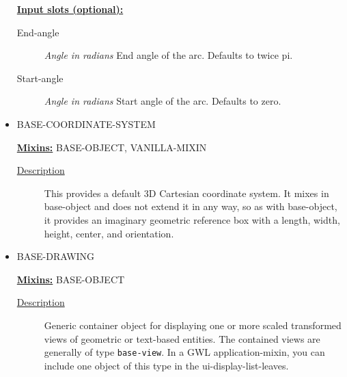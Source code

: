 \documentclass [11pt]{book}
\begin{document}
\begin{itemize}
\textbf{
\underline{Input slots (optional):}}

\begin{description}

\item [End-angle]
\emph{Angle in radians} End angle of the arc. Defaults to twice pi.


\item [Start-angle]
\emph{Angle in radians} Start angle of the arc. Defaults to zero.


\end{description}







\item {}BASE-COORDINATE-SYSTEM


\textbf{
\underline{Mixins:}} BASE-OBJECT, VANILLA-MIXIN





\begin{description}

\item [
\underline{Description}]


This provides a default 3D Cartesian
   coordinate system. It mixes in base-object and does not extend it
   in any way, so as with base-object, it provides an imaginary
   geometric reference box with a length, width, height, center, and
   orientation.



\end{description}









\item {}BASE-DRAWING


\textbf{
\underline{Mixins:}} BASE-OBJECT





\begin{description}

\item [
\underline{Description}]


Generic container object for displaying one or more scaled
transformed views of geometric or text-based entities. The contained views are generally 
of type \texttt{base-view}. In a GWL application-mixin, you can include one 
object of this type in the ui-display-list-leaves.


\end{description}
\end{itemize}
\end{document}

